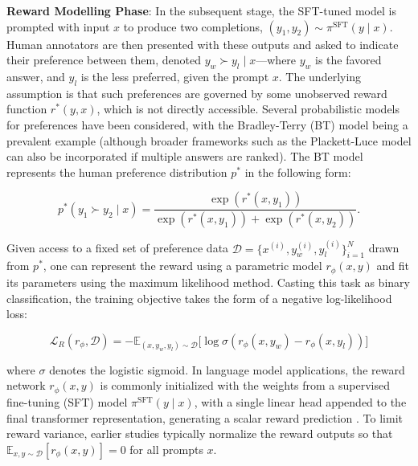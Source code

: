\textbf{Reward Modelling Phase}: In the subsequent stage, the SFT-tuned model is prompted with input $x$ to produce two completions, $(y_1, y_2)\sim \pi^\text{SFT}(y \mid x)$. Human annotators are then presented with these outputs and asked to indicate their preference between them, denoted $y_w\succ y_l \mid x$—where $y_w$ is the favored answer, and $y_l$ is the less preferred, given the prompt $x$. The underlying assumption is that such preferences are governed by some unobserved reward function $r^*(y, x)$, which is not directly accessible. Several probabilistic models for preferences have been considered, with the Bradley-Terry (BT) model \cite{bradley1952rankanalysis} being a prevalent example (although broader frameworks such as the Plackett-Luce model \citep{plackett1975analysis, luce2012individual} can also be incorporated if multiple answers are ranked). The BT model represents the human preference distribution $p^*$ in the following form:

\begin{equation}\label{eq:bradley-terry}
    p^*(y_1\succ y_2 \mid x)=\frac{\exp\left(r^*(x, y_1)\right)}{\exp\left(r^*(x, y_1)\right) + \exp\left(r^*(x, y_2)\right)}.
\end{equation}

Given access to a fixed set of preference data $\mathcal{D}=\bigl\{x^{(i)}, y_w^{(i)}, y_l^{(i)}\bigr\}_{i=1}^N$ drawn from $p^*$, one can represent the reward using a parametric model $r_{\phi}(x, y)$ and fit its parameters using the maximum likelihood method. Casting this task as binary classification, the training objective takes the form of a negative log-likelihood loss:

\begin{equation}\label{eq:reward_model}
    \mathcal{L}_R(r_{\phi}, \mathcal{D}) = -\mathbb{E}_{(x, y_w, y_l)\sim \mathcal{D}}\bigl[\log \sigma(r_{\phi}(x, y_w)- r_{\phi}(x, y_l))\bigr]
\end{equation}

where $\sigma$ denotes the logistic sigmoid. In language model applications, the reward network $r_{\phi}(x, y)$ is commonly initialized with the weights from a supervised fine-tuning (SFT) model $\pi^\text{SFT}(y \mid x)$, with a single linear head appended to the final transformer representation, generating a scalar reward prediction \cite{ziegler2020finetuning}. To limit reward variance, earlier studies typically normalize the reward outputs so that $\mathbb{E}_{x,y\sim \mathcal{D}}\left[r_\phi(x, y)\right] = 0$ for all prompts $x$.

